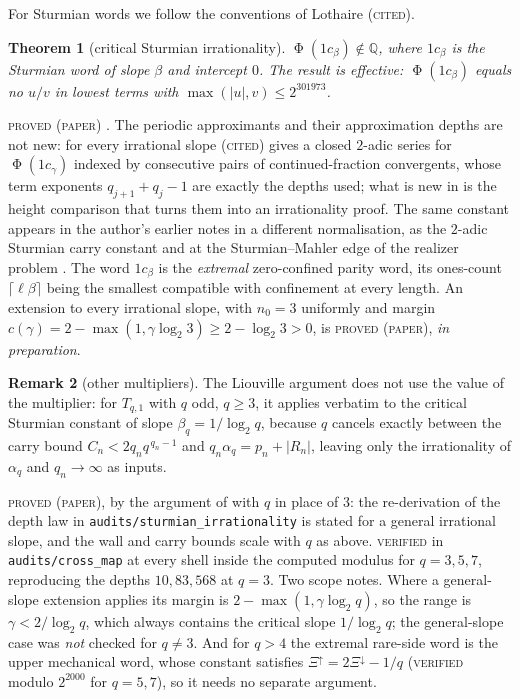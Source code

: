 \documentclass[11pt,reqno]{amsart}
\theoremstyle{plain}
\newtheorem{theorem}{Theorem}[section]
\theoremstyle{definition}
\newtheorem{remark}[theorem]{Remark}
\newcommand{\Q}{\mathbb{Q}}
\DeclareMathOperator{\Ph}{\Phi}
\newcommand{\lab}[1]{\textnormal{\textsc{\small #1}}}
\begin{document}
For Sturmian words we follow the conventions of Lothaire
\cite[Ch.~2]{Lothaire2002} (\lab{cited}).

\begin{theorem}[critical Sturmian irrationality]\label{thm:sturmian}
$\Ph(1c_\beta)\notin\Q$, where $1c_\beta$ is the Sturmian word of slope $\beta$
and intercept $0$. The result is effective: $\Ph(1c_\beta)$ equals no $u/v$ in
lowest terms with $\max(|u|,v)\le 2^{301973}$.
\end{theorem}
\lab{proved (paper)} \cite{DeJesusSturmian}. The periodic approximants and their
approximation depths are not new: for every irrational slope
\cite[Thm.~1]{LopezStoll2009} (\lab{cited}) gives a closed $2$-adic series for
$\Ph(1c_\gamma)$ indexed by consecutive pairs of continued-fraction convergents,
whose term exponents $q_{j+1}+q_j-1$ are exactly the depths used; what is new in
\cite{DeJesusSturmian} is the height comparison that turns them into an
irrationality proof. The same constant appears in the author's earlier notes in a
different normalisation, as the $2$-adic Sturmian carry constant
\cite{DeJesusA} and at the Sturmian--Mahler edge of the realizer problem
\cite{DeJesusB}. The word $1c_\beta$ is the
\emph{extremal} zero-confined parity word, its ones-count $\lceil \ell\beta\rceil$
being the smallest compatible with confinement at every length. An extension to
every irrational slope, with $n_0=3$ uniformly and margin
$c(\gamma)=2-\max(1,\gamma\log_2 3)\ge 2-\log_2 3>0$, is
\lab{proved (paper)}, \emph{in preparation}.

\begin{remark}[other multipliers]\label{rem:sturmianq}
The Liouville argument does not use the value of the multiplier: for $T_{q,1}$ with
$q$ odd, $q\ge3$, it applies verbatim to the critical Sturmian constant of slope
$\beta_q=1/\log_2 q$, because $q$ cancels exactly between the carry bound
$C_n<2q_nq^{\,q_n-1}$ and $q_n\alpha_q=p_n+|R_n|$, leaving only the irrationality of
$\alpha_q$ and $q_n\to\infty$ as inputs.
\end{remark}
\lab{proved (paper)}, by the argument of \cite{DeJesusSturmian} with $q$ in place of
$3$: the re-derivation of the depth law in \texttt{audits/sturmian\_irrationality} is
stated for a general irrational slope, and the wall and carry bounds scale with $q$
as above. \lab{verified} in \texttt{audits/cross\_map} at every shell inside the
computed modulus for $q=3,5,7$, reproducing the depths $10,83,568$ at $q=3$. Two scope
notes. Where a general-slope extension applies its margin is
$2-\max(1,\gamma\log_2 q)$, so the range is $\gamma<2/\log_2 q$, which always
contains the critical slope $1/\log_2 q$; the general-slope case was \emph{not}
checked for $q\ne3$. And for $q>4$ the extremal rare-side word is the upper
mechanical word, whose constant satisfies $\Xi^{\uparrow}=2\Xi^{\downarrow}-1/q$
(\lab{verified} modulo $2^{2000}$ for $q=5,7$), so it needs no separate argument.
\end{document}

